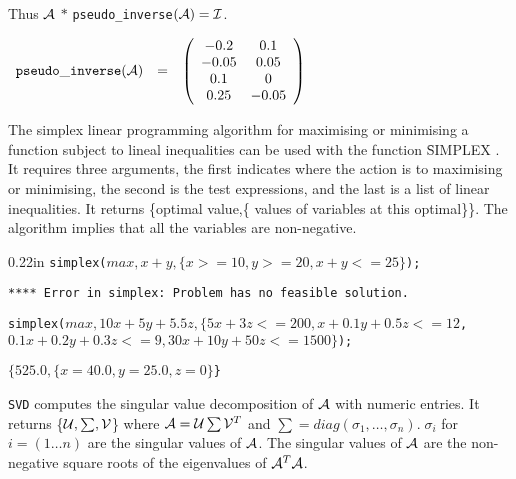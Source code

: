 \documentclass[11pt,letterpaper]{book}
\makeatletter
\newcommand{\underscore}{\_}
\newcommand{\ttindex}[1]{{\renewcommand{\_}{\protect\underscore}%
                          \index{#1@{\tt #1}}}}
\makeatother
\begin{document}
Thus ${\cal A}$ $ * $ {\tt pseudo\_inverse}$({\cal A}) = {\cal I}$.

\begin{flushleft}
\hspace*{0.1in}
\begin{math}
\begin{array}{ccc}
{\tt pseudo\_inverse}({\cal A}) & = &
        \left( \begin{array}{cc} -0.2 & 0.1 \\ -0.05 & 0.05 \\ 0.1 & 0
\\ 0.25 & -0.05
 \end{array} \right)
\end{array}
\end{math}
\end{flushleft}

\label{simplex}
The simplex linear programming algorithm for
maximising or minimising a function subject to lineal inequalities can
be used with the function \f{SIMPLEX}\ttindex{SIMPLEX}.  It requires
three arguments, the first indicates where the action is to maximising
or minimising, the second is the test expressions, and the last is a
list of linear inequalities.
It returns \{optimal value,\{ values of variables at this optimal\}\}.
The algorithm implies that all the variables are non-negative.

\begin{addtolength}{\leftskip}{0.22in}
{\tt simplex($max,x+y,\{x>=10,y>=20,x+y<=25\}$);}

{\tt ***** Error in simplex: Problem has no feasible solution.}

\vspace*{0.2in}

\parbox[t]{0.96\linewidth}{\tt simplex($max,10x+5y+5.5z,\{5x+3z<=200,
x+0.1y+0.5z<=12$,\\
\hspace*{0.55in} $0.1x+0.2y+0.3z<=9, 30x+10y+50z<=1500\}$);}

\vspace*{0.1in}
{\tt $\{525.0,\{x=40.0,y=25.0,z=0\}$\}}

\end{addtolength}

{\tt SVD}\ttindex{SVD} computes the singular value decomposition of
${\cal A}$ with numeric entries.   It returns \{${\cal U},\sum,{\cal V}$\} where ${\cal A} = {\cal U}
\sum {\cal V}^T$ and $\sum = diag(\sigma_{1}, \ldots ,\sigma_{n}). \;
\sigma_{i}$ for $i= (1 \ldots n)$ are the singular values of ${\cal A}$.
The singular values of ${\cal A}$ are the non-negative square roots of
the eigenvalues of ${\cal A}^T {\cal A}$.
\end{document}
